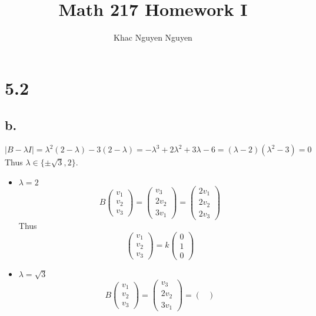 \documentclass[11pt]{article}
\title{\textbf{Math 217 Homework I}}
\author{Khac Nguyen Nguyen}
\date{}
\theoremstyle{mystyle}
\theoremstyle{definition}
\begin{document}
\section*{5.2}
\subsection*{b.}
\[
  |B-\lambda I| = \lambda^2 (2-\lambda) - 3(2-\lambda) = -\lambda^3 + 2 \lambda^2 + 3\lambda - 6 = (\lambda-2)(\lambda^2 - 3) = 0 
\]
Thus $\lambda \in \{\pm \sqrt{3}, 2\}$. \\
\begin{itemize}
  \item $\lambda = 2$ \\
    \[
    B 
    \begin{pmatrix}
      v_1 \\
      v_2 \\
      v_3
    \end{pmatrix} = 
    \begin{pmatrix}
      v_3 \\
      2v_2 \\
      3v_1
    \end{pmatrix} 
    = 
    \begin{pmatrix}
      2v_1 \\ 
      2v_2 \\
      2v_3
    \end{pmatrix}
    \]
    Thus 
    \[
      \begin{pmatrix}
        v_1 \\
        v_2 \\
        v_3 
      \end{pmatrix}
      = k 
      \begin{pmatrix}
        0 \\
        1 \\
        0
      \end{pmatrix}
    \]
  \item $\lambda = \sqrt{3}$ \\
    \[
    B 
    \begin{pmatrix}
      v_1 \\
      v_2 \\
      v_3
    \end{pmatrix} = 
    \begin{pmatrix}
      v_3 \\
      2v_2 \\
      3v_1
    \end{pmatrix} 
    = 
    \begin{pmatrix}

\end{pmatrix}\]
\end{itemize}
\end{document}
